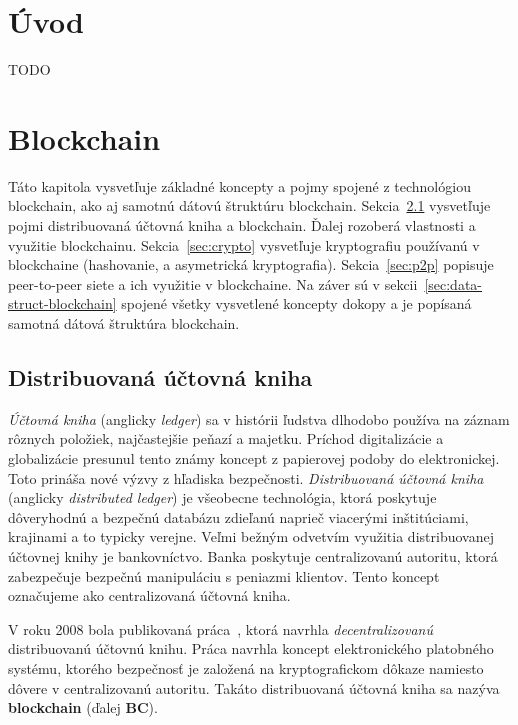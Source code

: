 \chapter{Úvod}
TODO

\chapter{Blockchain}\label{chap:blockchain}

Táto kapitola vysvetľuje základné koncepty a pojmy spojené z technológiou blockchain, ako aj samotnú dátovú štruktúru blockchain. Sekcia~\ref{sec:ladger} vysvetľuje pojmi distribuovaná účtovná kniha a blockchain. Ďalej rozoberá vlastnosti a využitie blockchainu. Sekcia~\ref{sec:crypto} vysvetľuje kryptografiu používanú v blockchaine (hashovanie, a asymetrická kryptografia). Sekcia~\ref{sec:p2p} popisuje peer-to-peer siete a ich využitie v blockchaine. Na záver sú v sekcii~\ref{sec:data-struct-blockchain} spojené všetky vysvetlené koncepty dokopy a je popísaná samotná dátová štruktúra blockchain.

\section{Distribuovaná účtovná kniha}\label{sec:ladger}
\textit{Účtovná kniha} (anglicky \textit{ledger}) sa v histórii ľudstva dlhodobo používa na záznam rôznych položiek, najčastejšie peňazí a majetku. Príchod digitalizácie a globalizácie presunul tento známy koncept z papierovej podoby do elektronickej. Toto prináša nové výzvy z hľadiska bezpečnosti.
\textit{Distribuovaná účtovná kniha} (anglicky \textit{distributed ledger}) je všeobecne technológia, ktorá poskytuje dôveryhodnú a bezpečnú databázu zdieľanú naprieč viacerými inštitúciami, krajinami a to typicky verejne. Veľmi bežným odvetvím využitia distribuovanej účtovnej knihy je bankovníctvo. Banka poskytuje centralizovanú autoritu, ktorá zabezpečuje bezpečnú manipuláciu s peniazmi klientov. Tento koncept označujeme ako centralizovaná účtovná kniha.~\cite{dltUkReport}

V roku 2008 bola publikovaná práca~\cite{satoshiBitcoin}, ktorá navrhla \textit{decentralizovanú} distribuovanú účtovnú knihu. Práca navrhla koncept elektronického platobného systému, ktorého bezpečnosť je založená na kryptografickom dôkaze namiesto dôvere v centralizovanú autoritu. Takáto distribuovaná účtovná kniha sa nazýva \textbf{blockchain} (ďalej \textbf{BC}).
